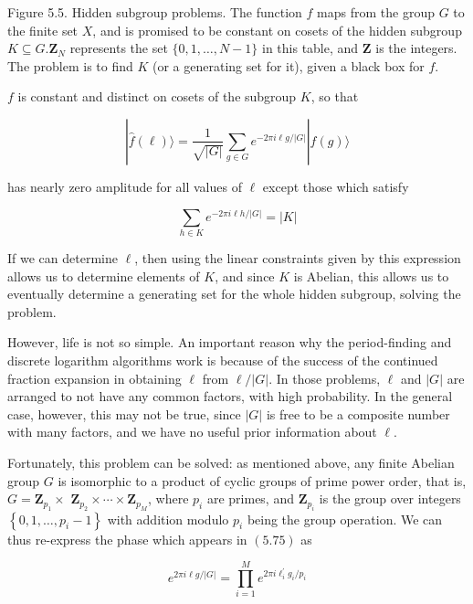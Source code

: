 Figure 5.5. Hidden subgroup problems. The function $f$ maps from the group $G$ to the finite set $X$, and is promised to be constant on cosets of the hidden subgroup $K \subseteq G . \mathbf{Z}_{N}$ represents the set $\{0,1, \ldots, N-1\}$ in this table, and $\mathbf{Z}$ is the integers. The problem is to find $K$ (or a generating set for it), given a black box for $f$.

$f$ is constant and distinct on cosets of the subgroup $K$, so that

\begin{equation*}
|\hat{f}(\ell)\rangle=\frac{1}{\sqrt{|G|}} \sum_{g \in G} e^{-2 \pi i \ell g /|G|}|f(g)\rangle \tag{5.76}
\end{equation*}

has nearly zero amplitude for all values of $\ell$ except those which satisfy

\begin{equation*}
\sum_{h \in K} e^{-2 \pi i \ell h /|G|}=|K| \tag{5.77}
\end{equation*}

If we can determine $\ell$, then using the linear constraints given by this expression allows us to determine elements of $K$, and since $K$ is Abelian, this allows us to eventually determine a generating set for the whole hidden subgroup, solving the problem.

However, life is not so simple. An important reason why the period-finding and discrete logarithm algorithms work is because of the success of the continued fraction expansion in obtaining $\ell$ from $\ell /|G|$. In those problems, $\ell$ and $|G|$ are arranged to not have any common factors, with high probability. In the general case, however, this may not be true, since $|G|$ is free to be a composite number with many factors, and we have no useful prior information about $\ell$.

Fortunately, this problem can be solved: as mentioned above, any finite Abelian group $G$ is isomorphic to a product of cyclic groups of prime power order, that is, $G=\mathbf{Z}_{p_{1}} \times$ $\mathbf{Z}_{p_{2}} \times \cdots \times \mathbf{Z}_{p_{M}}$, where $p_{i}$ are primes, and $\mathbf{Z}_{p_{i}}$ is the group over integers $\left\{0,1, \ldots, p_{i}-1\right\}$ with addition modulo $p_{i}$ being the group operation. We can thus re-express the phase which appears in $(5.75)$ as

\begin{equation*}
e^{2 \pi i \ell g /|G|}=\prod_{i=1}^{M} e^{2 \pi i \ell_{i}^{\prime} g_{i} / p_{i}} \tag{5.78}
\end{equation*}

